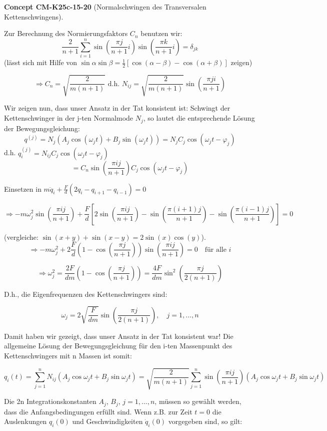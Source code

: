 \documentclass[10pt, letterpaper]{article}
\newcommand{\CustomHeading}[3]{%
  \par\medskip\noindent%
  \textbf{#1 #2} \textnormal{(#3)}.\enskip%
}
\newenvironment{CONC}[2]{\CustomHeading{Concept}{#1}{#2}}{}
\begin{document}
\begin{CONC}{CM-K25c-15-20}{Normalschwingen des Transversalen Kettenschwingens}
Zur Berechnung des Normierungsfaktors $C_n$ benutzen wir:
\[
\frac{2}{n+1} \sum_{i=1}^n \sin\left(\frac{\pi j}{n+1}i\right)\sin\left(\frac{\pi k}{n+1}i\right) = \delta_{jk}
\]
(lässt sich mit Hilfe von $\sin\alpha\sin\beta = \frac{1}{2}[\cos(\alpha-\beta)-\cos(\alpha+\beta)]$ zeigen)

\[\Rightarrow C_n = \sqrt{\frac{2}{m(n+1)}} \text{ d.h. } N_{ij} = \sqrt{\frac{2}{m(n+1)}}\sin\left(\frac{\pi j i}{n+1}\right)\]

Wir zeigen nun, dass unser Ansatz in der Tat konsistent ist:
Schwingt der Kettenschwinger in der j-ten Normalmode $N_j$, so lautet
die entsprechende Lösung der Bewegungsgleichung:
\[
q^{(j)} = N_j \left(A_j \cos(\omega_j t) + B_j \sin(\omega_j t)\right)
= N_j C_j \cos(\omega_j t - \varphi_j)
\]
d.h. $q_i^{(j)} = N_{ij} C_j \cos(\omega_j t - \varphi_j)$
\[
= C_n \sin\left(\frac{\pi i j}{n+1}\right) C_j \cos(\omega_j t - \varphi_j)
\]

Einsetzen in $m\ddot{q}_i + \frac{F}{d}(2q_i - q_{i+1} - q_{i-1}) = 0$

\[\Rightarrow -m\omega_j^2 \sin\left(\frac{\pi i j}{n+1}\right) + \frac{F}{d}\left[2\sin\left(\frac{\pi i j}{n+1}\right) - \sin\left(\frac{\pi(i+1)j}{n+1}\right) - \sin\left(\frac{\pi(i-1)j}{n+1}\right)\right] = 0\]

(vergleiche: $\sin(x+y)+\sin(x-y) = 2\sin(x)\cos(y)$).
\[
\Rightarrow -m\omega_j^2 + 2\frac{F}{d}\left(1-\cos\left(\frac{\pi j}{n+1}\right)\right)\sin\left(\frac{\pi i j}{n+1}\right) = 0 \quad \text{für alle } i
\]

\[
\Rightarrow \omega_j^2 = \frac{2F}{dm}\left(1-\cos\left(\frac{\pi j}{n+1}\right)\right) = \frac{4F}{dm}\sin^2\left(\frac{\pi j}{2(n+1)}\right)
\]

D.h., die Eigenfrequenzen des Kettenschwingers sind:

\[
\omega_j = 2\sqrt{\frac{F}{dm}}\sin\left(\frac{\pi j}{2(n+1)}\right), \quad j=1,...,n
\]

Damit haben wir gezeigt, dass unser Ansatz in der Tat konsistent war!
Die allgemeine Lösung der Bewegungsgleichung für den i-ten Massenpunkt des Kettenschwingers mit n Massen ist somit:

\[
q_i(t) = \sum_{j=1}^n N_{ij}\left(A_j\cos\omega_jt + B_j\sin\omega_jt\right)
= \sqrt{\frac{2}{m(n+1)}}\sum_{j=1}^n\sin\left(\frac{\pi ij}{n+1}\right)(A_j\cos\omega_jt + B_j\sin\omega_jt)
\]

Die 2n Integrationskonstanten $A_j$, $B_j$, $j=1,...,n$, müssen so gewählt werden, dass die Anfangsbedingungen erfüllt sind. Wenn z.B. zur Zeit $t=0$ die Auslenkungen $q_i(0)$ und Geschwindigkeiten $\dot{q}_i(0)$ vorgegeben sind, so gilt:


\end{CONC}
\end{document}
